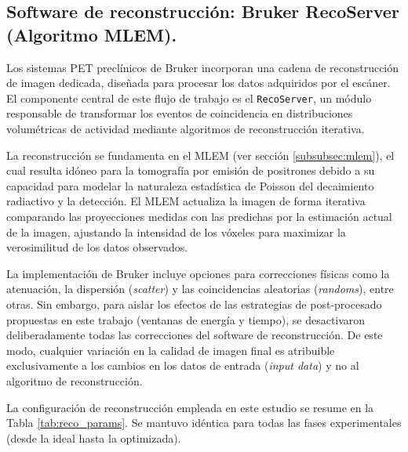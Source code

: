 \subsection{Software de reconstrucción: Bruker RecoServer (Algoritmo MLEM).}

Los sistemas PET preclínicos de Bruker incorporan una cadena de reconstrucción de imagen dedicada, diseñada para procesar los datos adquiridos por el escáner. El componente central de este flujo de trabajo es el \texttt{RecoServer}, un módulo responsable de transformar los eventos de coincidencia en distribuciones volumétricas de actividad mediante algoritmos de reconstrucción iterativa.

La reconstrucción se fundamenta en el MLEM (ver sección \ref{subsubsec:mlem}), el cual resulta idóneo para la tomografía por emisión de positrones debido a su capacidad para modelar la naturaleza estadística de Poisson del decaimiento radiactivo y la detección. El MLEM actualiza la imagen de forma iterativa comparando las proyecciones medidas con las predichas por la estimación actual de la imagen, ajustando la intensidad de los vóxeles para maximizar la verosimilitud de los datos observados.

La implementación de Bruker incluye opciones para correcciones físicas como la atenuación, la dispersión (\textit{scatter}) y las coincidencias aleatorias (\textit{randoms}), entre otras. Sin embargo, para aislar los efectos de las estrategias de post-procesado propuestas en este trabajo (ventanas de energía y tiempo), se desactivaron deliberadamente todas las correcciones del software de reconstrucción. De este modo, cualquier variación en la calidad de imagen final es atribuible exclusivamente a los cambios en los datos de entrada (\textit{input data}) y no al algoritmo de reconstrucción.

La configuración de reconstrucción empleada en este estudio se resume en la Tabla \ref{tab:reco_params}. Se mantuvo idéntica para todas las fases experimentales (desde la ideal hasta la optimizada).

